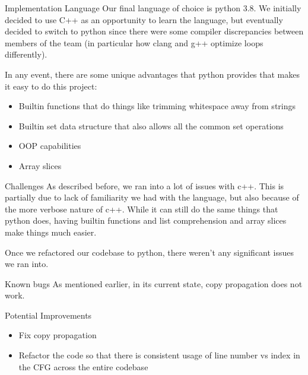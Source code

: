 \documentclass[letterpaper,12pt]{article}
\theoremstyle{definition}
\begin{document}
	\begin{section}{Implementation Language}
		Our final language of choice is python 3.8. We initially decided to use C++ as an opportunity to learn the language, but eventually decided to switch to python since there were some compiler discrepancies between members of the team (in particular how clang and g++ optimize loops differently).

		In any event, there are some unique advantages that python provides that makes it easy to do this project:
		\begin{itemize}
			\item Builtin functions that do things like trimming whitespace away from strings
			\item Builtin set data structure that also allows all the common set operations
			\item OOP capabilities
			\item Array slices
		\end{itemize}
	\end{section}

	\begin{section}{Challenges}
		As described before, we ran into a lot of issues with c++. This is partially due to lack of familiarity we had with the language, but also because of the more verbose nature of c++. While it can still do the same things that python does, having builtin functions and list comprehension and array slices make things much easier.

		Once we refactored our codebase to python, there weren't any significant issues we ran into.
	\end{section}

	\begin{section}{Known bugs}
		As mentioned earlier, in its current state, copy propagation does not work.
	\end{section}

	\begin{section}{Potential Improvements}
		\begin{itemize}
			\item Fix copy propagation
			\item Refactor the code so that there is consistent usage of line number vs index in the CFG across the entire codebase
		\end{itemize}
	\end{section}
\end{document}

